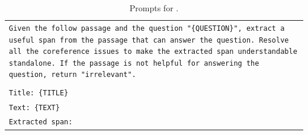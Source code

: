 \documentclass[11pt]{article}
\newcommand{\snippet}{{\sc{Snippet}}}
\begin{document}
\begin{table}[h]
    \centering
    \small
    \begin{tabular}{>{\raggedright\arraybackslash\tt}p{}<{}}
        \toprule
Given the follow passage and the question "\{QUESTION\}", extract a useful span from the passage that can answer the question. Resolve all the coreference issues to make the extracted span understandable standalone. If the passage is not helpful for answering the question, return "irrelevant".\\
\\
Title: \{TITLE\}\\
Text: \{TEXT\}\\
Extracted span:\\
        \bottomrule
    \end{tabular}
    \caption{
        Prompts for \snippet{}.
    }
    \label{tab:prompt_snippet}
\end{table}
\end{document}
